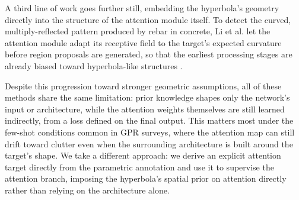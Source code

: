 \documentclass[lettersize,journal]{IEEEtran}
\begin{document}
A third line of work goes further still, embedding the hyperbola's geometry
directly into the structure of the attention module itself. To detect the
curved, multiply-reflected pattern produced by rebar in concrete, Li et al. let
the attention module adapt its receptive field to the target's expected
curvature before region proposals are generated, so that the earliest processing
stages are already biased toward hyperbola-like structures \cite{li2025rebar}.



Despite this progression toward stronger geometric assumptions, all of these
methods share the same limitation: prior knowledge shapes only the network's
input or architecture, while the attention weights themselves are still learned
indirectly, from a loss defined on the final output. This matters most under the
few-shot conditions common in GPR surveys, where the attention map can still
drift toward clutter even when the surrounding architecture is built around the
target's shape. We take a different approach: we derive an explicit attention
target directly from the parametric annotation and use it to supervise the
attention branch, imposing the hyperbola's spatial prior on attention directly
rather than relying on the architecture alone.


\end{document}
